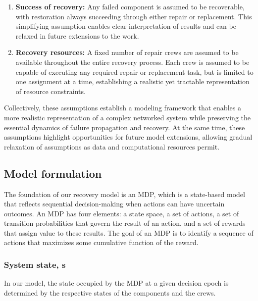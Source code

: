 \documentclass[conference]{IEEEtran}
\begin{document}
\begin{enumerate}
    \item \textbf{Success of recovery:} Any failed component is assumed to be recoverable, with restoration always succeeding through either repair or replacement. This simplifying assumption enables clear interpretation of results and can be relaxed in future extensions to the work.

    \item  \textbf{Recovery resources:} A fixed number of repair crews are assumed to be available throughout the entire recovery process. Each crew is assumed to be capable of executing any required repair or replacement task, but is limited to one assignment at a time, establishing a realistic yet tractable representation of resource constraints.
\end{enumerate}

Collectively, these assumptions establish a modeling framework that enables a more realistic representation of a complex networked system while preserving the essential dynamics of failure propagation and recovery. At the same time, these assumptions highlight opportunities for future model extensions, allowing gradual relaxation of assumptions as data and computational resources permit.

\subsection{Model formulation}
The foundation of our recovery model is an MDP, which is a state-based model that reflects sequential decision-making when actions can have uncertain outcomes. An MDP has four elements: a state space, a set of actions, a set of transition probabilities that govern the result of an action, and a set of rewards that assign value to these results. The goal of an MDP is to identify a sequence of actions that maximizes some cumulative function of the reward. 

\subsubsection{System state, \texorpdfstring{$\mathbf{s}$}{S}}
In our model, the state occupied by the MDP at a given decision epoch is determined by the respective states of the components and the crews.
\end{document}
